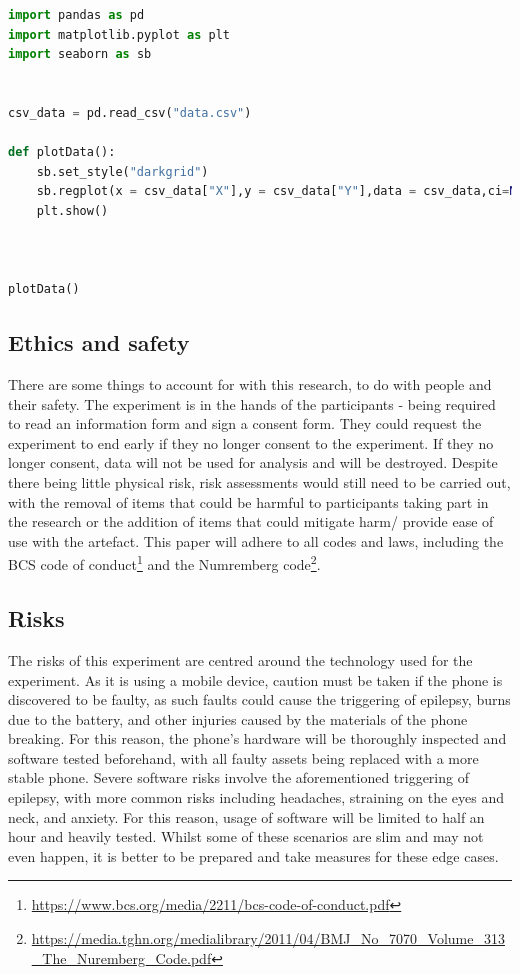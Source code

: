 \documentclass[conference]{IEEEtran}
\begin{document}
%

\begin{lstlisting}[language=Python, caption=Python Script for generating Graphs,captionpos=b]
import pandas as pd
import matplotlib.pyplot as plt
import seaborn as sb


csv_data = pd.read_csv("data.csv")

def plotData():
    sb.set_style("darkgrid")
    sb.regplot(x = csv_data["X"],y = csv_data["Y"],data = csv_data,ci=None)
    plt.show()



plotData()
\end{lstlisting}
\label{tab:Listing 1}

\subsection{Ethics and safety}
There are some things to account for with this research, to do with people and their safety. The experiment is in the hands of the participants - being required to read an information form and sign a consent form. They could request the experiment to end early if they no longer consent to the experiment.  If they no longer consent, data will not be used for analysis and will be destroyed. Despite there being little physical risk, risk assessments would still need to be carried out, with the removal of items that could be harmful to participants taking part in the research or the addition of items that could mitigate harm/ provide ease of use with the artefact. This paper will adhere to all codes and laws, including the BCS code of conduct\footnote{\url{https://www.bcs.org/media/2211/bcs-code-of-conduct.pdf}} and the Numremberg code\footnote{\url{https://media.tghn.org/medialibrary/2011/04/BMJ_No_7070_Volume_313_The_Nuremberg_Code.pdf}}.\\
\subsection{Risks}
The risks of this experiment are centred around the technology used for the experiment. As it is using a mobile device, caution must be taken if the phone is discovered to be faulty, as such faults could cause the triggering of epilepsy, burns due to the battery, and other injuries caused by the materials of the phone breaking. For this reason, the phone's hardware will be thoroughly inspected and software tested beforehand, with all faulty assets being replaced with a more stable phone. Severe software risks involve the aforementioned triggering of epilepsy, with more common risks including headaches, straining on the eyes and neck, and anxiety. For this reason, usage of software will be limited to half an hour and heavily tested. Whilst some of these scenarios are slim and may not even happen, it is better to be prepared and take measures for these edge cases.\\
\end{document}
